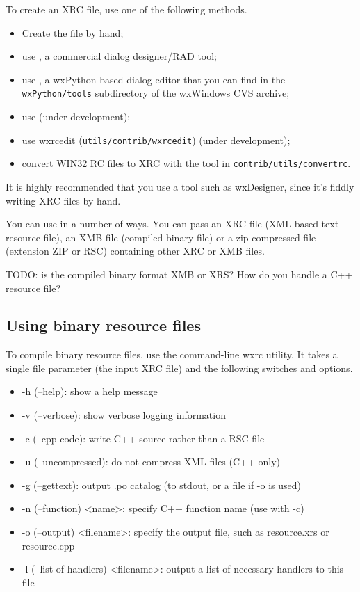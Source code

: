 To create an XRC file, use one of the following methods.

\begin{itemize}
\item Create the file by hand;
\item use , a commercial dialog designer/RAD tool;
\item use , a wxPython-based
dialog editor that you can find in the {\tt wxPython/tools} subdirectory of the wxWindows
CVS archive;
\item use  (under development);
\item use wxrcedit ({\tt utils/contrib/wxrcedit}) (under development);
\item convert WIN32 RC files to XRC with the tool in {\tt contrib/utils/convertrc}.
\end{itemize}

It is highly recommended that you use a tool such as wxDesigner, since it's fiddly writing
XRC files by hand.

You can use  in a number of ways.
You can pass an XRC file (XML-based text resource file), an XMB file (compiled binary file)
or a zip-compressed file (extension ZIP or RSC) containing other XRC or XMB files.

TODO: is the compiled binary format XMB or XRS? How do you handle a C++ resource file?

\subsection{Using binary resource files}\label{binaryresourcefiles}

To compile binary resource files, use the command-line wxrc utility. It takes a single file parameter (the
input XRC file) and the following switches and options.

\begin{itemize}
\item -h (--help): show a help message
\item -v (--verbose): show verbose logging information
\item -c (--cpp-code): write C++ source rather than a RSC file
\item -u (--uncompressed): do not compress XML files (C++ only)
\item -g (--gettext): output .po catalog (to stdout, or a file if -o is used)
\item -n (--function) <name>: specify C++ function name (use with -c)
\item -o (--output) <filename>: specify the output file, such as resource.xrs or resource.cpp
\item -l (--list-of-handlers) <filename>: output a list of necessary handlers to this file
\end{itemize}


